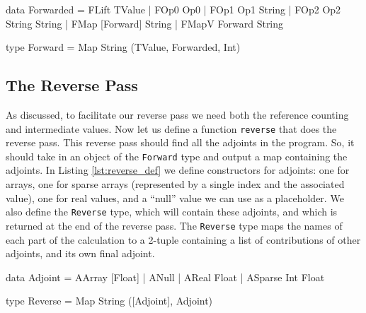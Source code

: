     \begin{haskell}[caption=Forward pass data structures, label=lst:forward, gobble=8]
        data Forwarded
            = FLift TValue
            | FOp0  Op0
            | FOp1  Op1       String
            | FOp2  Op2       String String
            | FMap  [Forward] String
            | FMapV Forward   String

        type Forward = Map String (TValue, Forwarded, Int)
    \end{haskell}

    \subsection{The Reverse Pass}
        As discussed, to facilitate our reverse pass we need both the reference counting and intermediate values.
        Now let us define a function \texttt{reverse} that does the reverse pass.
        This reverse pass should find all the adjoints in the program.
        So, it should take in an object of the \texttt{Forward} type and output a map containing the adjoints.
        In Listing \ref{lst:reverse_def} we define constructors for adjoints: one for arrays, one for sparse arrays (represented by a single index and the associated value), one for real values, and a ``null'' value we can use as a placeholder.
        We also define the \texttt{Reverse} type, which will contain these adjoints, and which is returned at the end of the reverse pass.
        The \texttt{Reverse} type maps the names of each part of the calculation to a 2-tuple containing a list of contributions of other adjoints, and its own final adjoint.

        \begin{haskell}[caption=Definition of the \texttt{Reverse} type, label=lst:reverse_def, gobble=12]
            data Adjoint
                = AArray  [Float]
                | ANull
                | AReal   Float
                | ASparse Int Float

            type Reverse = Map String ([Adjoint], Adjoint)
        \end{haskell}

